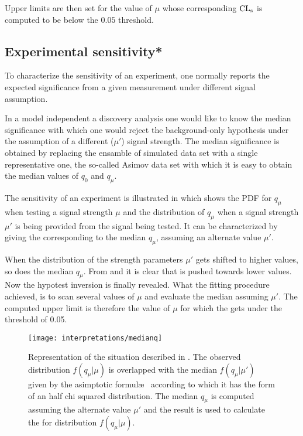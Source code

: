 Upper limits are then set for the value of $\mu$ whose corresponding $\text{CL}_\textup{s}$ is computed to be below the $0.05$ threshold.

\subsection{Experimental sensitivity*}
\label{sec:sensitivity}
To characterize the sensitivity of an experiment, one normally reports the expected significance from a given measurement under different signal assumption.


In a model independent a discovery analysis one would like to know the median significance with which one would reject the background-only hypothesis under the assumption of a different ($\mu'$) signal strength. The median significance is obtained by replacing the ensamble of simulated data set with a single representative one, the so-called Asimov data set with which it is easy to obtain the median values of $q_0$ and $q_\mu$.

The sensitivity of an experiment is illustrated in \Fig{\ref{fig:medianq}} which shows the PDF for $q_\mu$ when testing a signal strength $\mu$ and the distribution of $q_\mu$ when a signal strength $\mu'$ is being provided from the signal being tested. It can be characterized by giving the \p corresponding to the median $q_\mu$, assuming an alternate value $\mu'$. 

When the distribution of the strength parameters $\mu'$ gets shifted to higher values, so does the median $q_\mu$. From \Eqn{\ref{eqn:pdaq0}} and \Eqn{\ref{eqn:pdaqmu}} it is clear that \p is pushed towards lower values. Now the hypotest inversion is finally revealed. What the fitting procedure achieved, is to scan several values of $\mu$ and evaluate the median \p assuming $\mu'$. The computed upper limit is therefore the value of $\mu$ for which the \p gets under the threshold of \num{0.05}.

\begin{figure}[pt]
\centering
\texttt{[image: interpretations/medianq]}
\caption{Representation of the situation described in \Sect{\ref{sec:sensitivity}}. The observed distribution $f(q_\mu \vert \mu)$ is overlapped with the median $f(q_\mu \vert \mu')$ given by the asimptotic formul\ae~ according to which it has the form of an half chi squared distribution. The median $q_\mu$ is computed assuming the alternate value $\mu'$ and the result is used to calculate the \p for distribution $f(q_\mu \vert \mu)$.}
\label{fig:medianq}
\end{figure}

